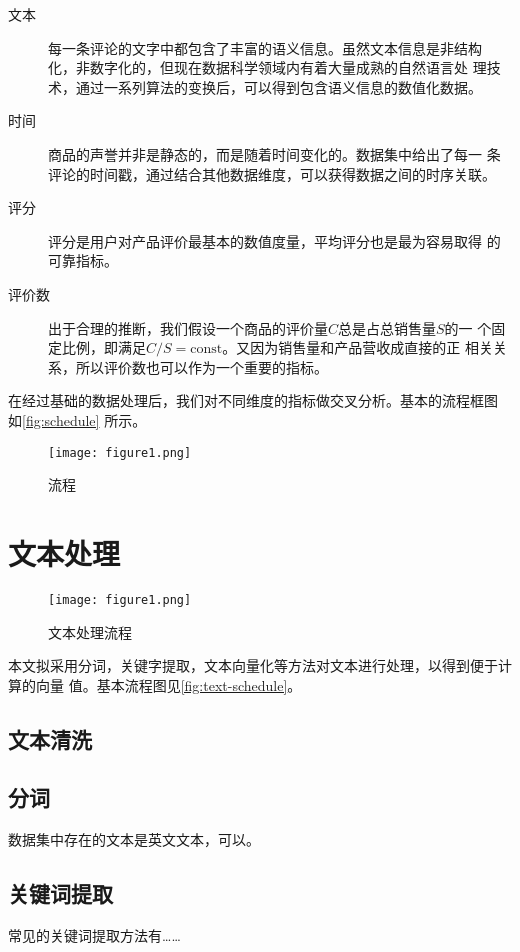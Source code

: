 \begin{description}
    \item [文本] 每一条评论的文字中都包含了丰富的语义信息。虽然文本信息是非结构
        化，非数字化的，但现在数据科学领域内有着大量成熟的{\fKai 自然语言处
        理}技术，通过一系列算法的变换后，可以得到包含语义信息的数值化数据。
    \item [时间] 商品的声誉并非是静态的，而是随着时间变化的。数据集中给出了每一
        条评论的时间戳，通过结合其他数据维度，可以获得数据之间的时序关联。
    \item [评分] 评分是用户对产品评价最基本的数值度量，平均评分也是最为容易取得
        的可靠指标。
    \item [评价数] 出于合理的推断，我们假设一个商品的评价量$C$总是占总销售量$S$的一
        个固定比例，即满足$C/S=\textrm{const}$。又因为销售量和产品营收成直接的正
        相关关系，所以评价数也可以作为一个重要的指标。
\end{description}

在经过基础的数据处理后，我们对不同维度的指标做交叉分析。基本的流程框图
如\autoref{fig:schedule} 所示。

\begin{figure}
    \centering
    \texttt{[image: figure1.png]}
    \caption{流程}
    \label{fig:schedule}
\end{figure}


\section{文本处理}

\begin{figure}
    \centering
    \texttt{[image: figure1.png]}
    \caption{文本处理流程}
    \label{fig:text-schedule}
\end{figure}

本文拟采用分词，关键字提取，文本向量化等方法对文本进行处理，以得到便于计算的向量
值。基本流程图见\autoref{fig:text-schedule}。

\subsection{文本清洗}

\subsection{分词}
数据集中存在的文本是英文文本，可以。

\subsection{关键词提取}
常见的关键词提取方法有……

